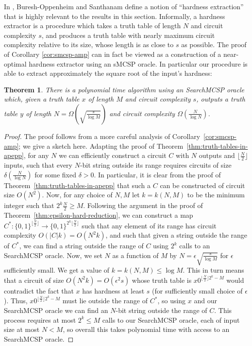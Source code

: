 \documentclass[11pt]{article}
\newtheorem{theorem}{Theorem}
\newcommand{\dash}{\text{-}}
\begin{document}
In \cite{hardness-harder}, Buresh-Oppenheim and Santhanam define a notion of ``hardness extraction'' that is highly relevant to the results in this section. Informally, a hardness extractor is a procedure which takes a truth table of length $N$ and circuit complexity $s$, and produces a truth table with nearly maximum circuit complexity relative to its size, whose length is as close to $s$ as possible. The proof of Corollary \ref{cor:smcsp-amp} can in fact be viewed as a construction of a near-optimal hardness extractor using an {\sc sMCSP} oracle. In particular our procedure is able to extract approximately the square root of the input's hardness:
\begin{theorem}\label{thm:hardness-extractor}
There is a polynomial time algorithm using an {\sc Search\dash MCSP} oracle which, given a truth table $x$ of length $M$ and circuit complexity $s$, outputs a truth table $y$ of length $N = {\Omega}(\sqrt{\frac{s}{\log M}})$ and circuit complexity $\Omega(\frac{N}{\log N})$.
\end{theorem}
\begin{proof}
The proof follows from a more careful analysis of Corollary~\ref{cor:smcsp-amp}; we give a sketch here. Adapting the proof of Theorem~\ref{thm:truth-tables-in-apepp}, for any $N$ we can efficiently construct a circuit $C$ with $N$ outputs and $\lfloor\frac{N}{2}\rfloor$ inputs, such that every $N$-bit string outside its range requires circuits of size $\delta(\frac{N}{\log N})$ for some fixed $\delta > 0$. 
In particular, it is clear from the proof of Theorem~\ref{thm:truth-tables-in-apepp} that such a $C$ can be constructed of circuit size $O(N^2)$.
Now, for any choice of $N,M$ let $k = k(N,M)$ to be the minimum integer such that $2^k\frac{N}{2} \geq M$. Following the argument in the proof of Theorem~\ref{thm:epsilon-hard-reduction}, we can construct a map $C^*: \{0,1\}^{\lfloor\frac{N}{2}\rfloor} \rightarrow \{0,1\}^{2^k\lfloor\frac{N}{2}\rfloor}$ such that any element of its range has circuit complexity $O(|C|k) = O(N^2k)$, and such that given a string outside the range of $C^*$, we can find a string outside the range of $C$ using $2^k$ calls to an {\sc Search\dash MCSP} oracle. Now, we set $N$ as a function of $M$ by $N = \epsilon\sqrt{\frac{s}{\log M}}$ for $\epsilon$ sufficiently small. We get a value of $k = k(N,M) \leq \log M$. This in turn means that a circuit of size $O(N^2 k) = O(\epsilon^2 s)$ whose truth table is $x0^{\lfloor\frac{N}{2}\rfloor2^k-M}$ would contradict the fact that $x$ has hardness at least $s$ (for sufficiently small choice of $\epsilon$). Thus, $x0^{\lfloor\frac{N}{2}\rfloor2^k-M}$ must lie outside the range of $C^*$, so using $x$ and our {\sc Search\dash MCSP} oracle we can find an $N$-bit string outside the range of $C$. This process requires at most $2^k \leq M$ calls to our {\sc Search\dash MCSP} oracle, each of input size at most $N < M$, so overall this takes polynomial time with access to an {\sc Search\dash MCSP} oracle.
\end{proof}
\end{document}
